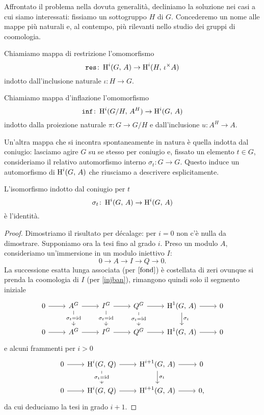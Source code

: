 Affrontato il problema nella dovuta generalità, decliniamo la soluzione nei casi a cui siamo interessati: fissiamo un sottogruppo $ H $ di $ G $. Concederemo un nome alle mappe più naturali e, al contempo, più rilevanti nello studio dei gruppi di coomologia.
\begin{definition}[Restrizione]
	Chiamiamo mappa di restrizione l'omomorfismo
	\[ \operatorname{\mathtt{res}} \colon \operatorname{H}^i(G, \, A) \to \operatorname{H}^i(H, \, \iota^\times A) \]
	indotto dall'inclusione naturale $ \iota \colon H \to G $.
\end{definition}

\begin{definition}[Inflazione]
	Chiamiamo mappa d'inflazione l'omomorfismo
	\[ \operatorname{\mathtt{inf}} \colon \operatorname{H}^i(G/H, \, A^H) \to \operatorname{H}^i(G, \, A) \]
	indotto dalla proiezione naturale $ \pi \colon G \to G/H $ e dall'inclusione $ u \colon A^H \to A $.
\end{definition}

Un'altra mappa che si incontra spontaneamente in natura è quella indotta dal coniugio: lasciamo agire $ G $ su se stesso per coniugio e, fissato un elemento $ t \in G $, consideriamo il relativo automorfismo interno $ \sigma_t \colon G \to G $. Questo induce un automorfismo di $ \operatorname{H}^i(G, \, A) $ che riusciamo a descrivere esplicitamente.

\begin{proposition}\label{coniugio}
	L'isomorfismo indotto dal coniugio per $ t $
	\[ \sigma_t \colon \operatorname{H}^i(G, \, A) \to \operatorname{H}^i(G, \, A) \]
	è l'identità.
\end{proposition}
\begin{proof}
	Dimostriamo il risultato per décalage: per $ i = 0 $ non c'è nulla da dimostrare. Supponiamo ora la tesi fino al grado $ i $. Preso un modulo $ A $, consideriamo un'immersione in un modulo iniettivo $ I $:
	\[ 0 \to A \to I \to Q \to 0. \]
	La successione esatta lunga associata (per $ \ref{fond} $) è costellata di zeri ovunque si prenda la coomologia di $ I $ (per \ref{injban}), rimangono quindi solo il segmento iniziale
	\[\begin{tikzcd}
	0 \rar & A^G \rar\dar["\sigma_t = \id" description] & I^G \rar\dar["\sigma_t = \id" description] & Q^G \rar\dar["\sigma_t = \id" description] & \HH^1(G, \, A) \rar\dar["\sigma_t"] & 0 \\
	0 \rar & A^G \rar & I^G \rar & Q^G \rar & \HH^1(G, \, A) \rar & 0
	\end{tikzcd}\]
	e alcuni frammenti per $ i > 0 $
	\[\begin{tikzcd}
	0 \rar & \HH^i(G, \, Q) \rar\dar["\sigma_t = \id" description] & \HH^{i+1}(G, \, A) \rar\dar["\sigma_t"] & 0 \\
	0 \rar & \HH^i(G, \, Q) \rar & \HH^{i+1}(G, \, A) \rar & 0,
	\end{tikzcd}\]
	da cui deduciamo la tesi in grado $ i+1 $.
\end{proof}

